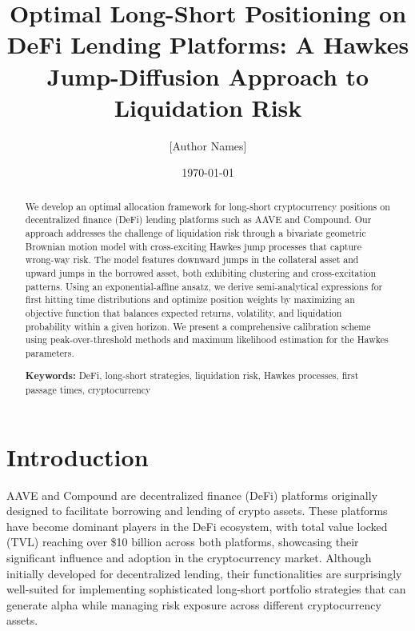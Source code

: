 \documentclass{article}
\title{Optimal Long-Short Positioning on DeFi Lending Platforms: A Hawkes Jump-Diffusion Approach to Liquidation Risk}
\author{[Author Names]}
\date{\today}
\theoremstyle{definition}
\begin{document}
\maketitle

\begin{abstract}
We develop an optimal allocation framework for long-short cryptocurrency positions on decentralized finance (DeFi) lending platforms such as AAVE and Compound. Our approach addresses the challenge of liquidation risk through a bivariate geometric Brownian motion model with cross-exciting Hawkes jump processes that capture wrong-way risk. The model features downward jumps in the collateral asset and upward jumps in the borrowed asset, both exhibiting clustering and cross-excitation patterns. Using an exponential-affine ansatz, we derive semi-analytical expressions for first hitting time distributions and optimize position weights by maximizing an objective function that balances expected returns, volatility, and liquidation probability within a given horizon. We present a comprehensive calibration scheme using peak-over-threshold methods and maximum likelihood estimation for the Hawkes parameters.

\textbf{Keywords:} DeFi, long-short strategies, liquidation risk, Hawkes processes, first passage times, cryptocurrency
\end{abstract}

\section{Introduction}

AAVE and Compound are decentralized finance (DeFi) platforms originally designed to facilitate borrowing and lending of crypto assets. These platforms have become dominant players in the DeFi ecosystem, with total value locked (TVL) reaching over \$10 billion across both platforms, showcasing their significant influence and adoption in the cryptocurrency market. Although initially developed for decentralized lending, their functionalities are surprisingly well-suited for implementing sophisticated long-short portfolio strategies that can generate alpha while managing risk exposure across different cryptocurrency assets.
\end{document}
